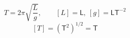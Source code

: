 \[ T = 2\pi \sqrt{\frac{L}{g}}, \qquad [L] = \mathsf{L},\ [g] = \mathsf{L}\mathsf{T}^{-2} \]
\[ [T] = \left(\mathsf{T}^{2}\right)^{1/2} = \mathsf{T} \]
